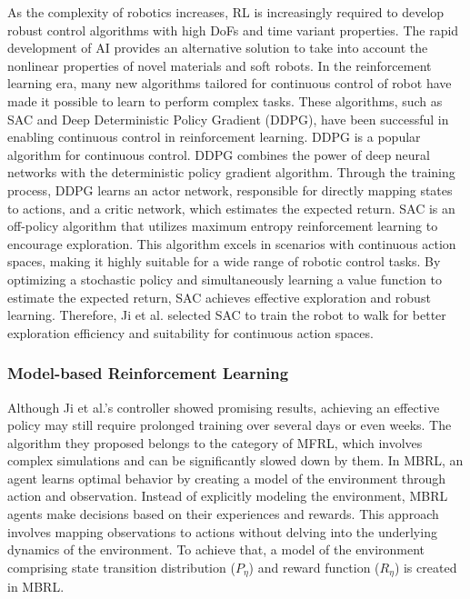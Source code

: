 As the complexity of robotics increases, \ac{RL} is increasingly required to develop robust control algorithms with high \ac{DoF}s and time variant properties\cite{zhang2017Effective}. The rapid development of AI provides an alternative solution to take into account the nonlinear properties of novel materials and soft robots\cite{tang2021Modelbased}. In the reinforcement learning era, many new algorithms tailored for continuous control of robot have made it possible to learn to perform complex tasks. These algorithms, such as \ac{SAC}\cite{haarnoja2018Soft} and Deep Deterministic Policy Gradient (DDPG)\cite{silver2014Deterministic}, have been successful in enabling continuous control in reinforcement learning\cite{haarnoja2019Learning, peng2018SimtoReal}. DDPG is a popular algorithm for continuous control. DDPG combines the power of deep neural networks with the deterministic policy gradient algorithm. Through the training process, DDPG learns an actor network, responsible for directly mapping states to actions, and a critic network, which estimates the expected return\cite{silver2014Deterministic}. SAC is an off-policy algorithm that utilizes maximum entropy reinforcement learning to encourage exploration\cite{haarnoja2018Soft}. This algorithm excels in scenarios with continuous action spaces\cite{haarnoja2019Learning}, making it highly suitable for a wide range of robotic control tasks. By optimizing a stochastic policy and simultaneously learning a value function to estimate the expected return, SAC achieves effective exploration and robust learning\cite{haarnoja2019Learning, peng2018SimtoReal}. Therefore, Ji et al. \cite{ji2022Synthesizing} selected \ac{SAC} to train the robot to walk for better exploration efficiency and suitability for continuous action spaces.

\subsubsection{Model-based Reinforcement Learning}
Although Ji et al.\cite{ji2022Synthesizing}'s controller showed promising results, achieving an effective policy may still require prolonged training over several days or even weeks. The algorithm they proposed belongs to the category of \ac{MFRL}, which involves complex simulations and can be significantly slowed down by them. In \ac{MBRL}, an agent learns optimal behavior by creating a model of the environment through action and observation. Instead of explicitly modeling the environment, MBRL agents make decisions based on their experiences and rewards. This approach involves mapping observations to actions without delving into the underlying dynamics of the environment. To achieve that, a model of the environment comprising state transition distribution ($P_\eta$) and reward function ($R_\eta$) is created in MBRL.



